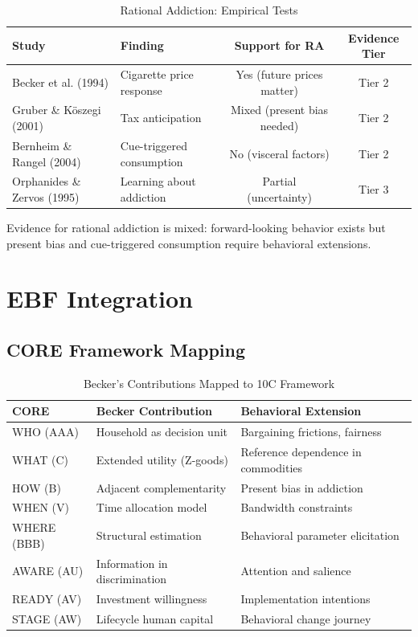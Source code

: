 \begin{table}[htbp]
\centering
\caption{Rational Addiction: Empirical Tests}
\label{tab:gb-addiction-evidence}
\begin{tabular}{llcc}
\toprule
\textbf{Study} & \textbf{Finding} & \textbf{Support for RA} & \textbf{Evidence Tier} \\
\midrule
Becker et al. (1994) & Cigarette price response & Yes (future prices matter) & Tier 2 \\
Gruber \& K\"{o}szegi (2001) & Tax anticipation & Mixed (present bias needed) & Tier 2 \\
Bernheim \& Rangel (2004) & Cue-triggered consumption & No (visceral factors) & Tier 2 \\
Orphanides \& Zervos (1995) & Learning about addiction & Partial (uncertainty) & Tier 3 \\
\bottomrule
\end{tabular}
\end{table}

Evidence for rational addiction is mixed: forward-looking behavior exists but present bias and cue-triggered consumption require behavioral extensions.

\section{EBF Integration}
\label{sec:gb-integration}

\subsection{CORE Framework Mapping}

\begin{table}[htbp]
\centering
\caption{Becker's Contributions Mapped to 10C Framework}
\label{tab:gb-9c-mapping}
\begin{tabular}{lll}
\toprule
\textbf{CORE} & \textbf{Becker Contribution} & \textbf{Behavioral Extension} \\
\midrule
WHO (AAA) & Household as decision unit & Bargaining frictions, fairness \\
WHAT (C) & Extended utility (Z-goods) & Reference dependence in commodities \\
HOW (B) & Adjacent complementarity & Present bias in addiction \\
WHEN (V) & Time allocation model & Bandwidth constraints \\
WHERE (BBB) & Structural estimation & Behavioral parameter elicitation \\
AWARE (AU) & Information in discrimination & Attention and salience \\
READY (AV) & Investment willingness & Implementation intentions \\
STAGE (AW) & Lifecycle human capital & Behavioral change journey \\
\bottomrule
\end{tabular}
\end{table}

